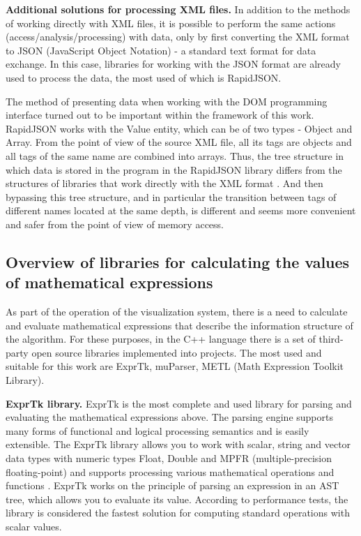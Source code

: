 \textbf{Additional solutions for processing XML files.} In addition to the methods of working directly with XML files, it is possible to perform the same actions (access/analysis/processing) with data, only by first converting the XML format to JSON (JavaScript Object Notation) - a standard text format for data exchange. In this case, libraries for working with the JSON format are already used to process the data, the most used of which is RapidJSON.

The method of presenting data when working with the DOM programming interface turned out to be important within the framework of this work. RapidJSON works with the Value entity, which can be of two types - Object and Array. From the point of view of the source XML file, all its tags are objects and all tags of the same name are combined into arrays. Thus, the tree structure in which data is stored in the program in the RapidJSON library differs from the structures of libraries that work directly with the XML format \cite{m15}. And then bypassing this tree structure, and in particular the transition between tags of different names located at the same depth, is different and seems more convenient and safer from the point of view of memory access.

\subsection{Overview of libraries for calculating the values of mathematical expressions}

As part of the operation of the visualization system, there is a need to calculate and evaluate mathematical expressions that describe the information structure of the algorithm. For these purposes, in the C++ language there is a set of third-party open source libraries implemented into projects. The most used and suitable for this work are ExprTk, muParser, METL (Math Expression Toolkit Library).

\textbf{ExprTk library.} ExprTk is the most complete and used library for parsing and evaluating the mathematical expressions above. The parsing engine supports many forms of functional and logical processing semantics and is easily extensible. The ExprTk library allows you to work with scalar, string and vector data types with numeric types Float, Double and MPFR (multiple-precision floating-point) and supports processing various mathematical operations and functions \cite{m17}. ExprTk works on the principle of parsing an expression in an AST tree, which allows you to evaluate its value. According to performance tests, the library is considered the fastest solution for computing standard operations with scalar values.


